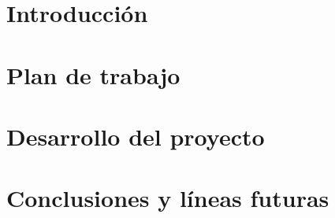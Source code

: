 \documentclass[spanish,a4paper,14pt,oneside]{extreport}
\begin{document}
\renewcommand{\thepage}{\roman{page}}
\setcounter{page}{1}


\tableofcontents

\newpage{\pagestyle{empty}}

\listoffigures

\newpage{\pagestyle{empty}}

\listoftables

\newpage{\pagestyle{empty}}

\renewcommand{\thepage}{\arabic{page}}
\setcounter{page}{1}


\chapter{Introducción}
\label{chapter:intro}




\chapter{Plan de trabajo}
\label{chapter:dos}



\newpage

\newpage{\pagestyle{empty}}
\thispagestyle{empty}

\chapter{Desarrollo del proyecto}
\label{chapter:tres}



\newpage{\pagestyle{empty}}
\thispagestyle{empty}

\chapter{Conclusiones y líneas futuras}
\label{chapter:Conclusiones}
\end{document}
